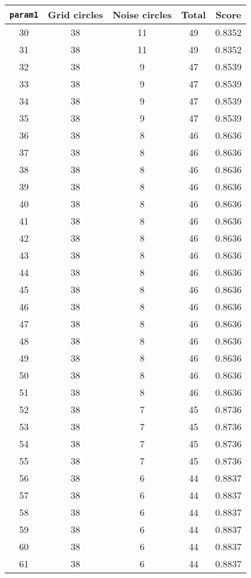\documentclass[letterpaper, 12pt]{article}
\begin{document}
\begin{longtable}{|c|c|c|c|c|}
\hline
\textbf{\texttt{param1}} & \textbf{Grid circles} & \textbf{Noise circles} & \textbf{Total} & \textbf{Score} \\
\hline
30 & 38 & 11 & 49 & 0.8352 \\
\hline
31 & 38 & 11 & 49 & 0.8352 \\
\hline
32 & 38 & 9 & 47 & 0.8539 \\
\hline
33 & 38 & 9 & 47 & 0.8539 \\
\hline
34 & 38 & 9 & 47 & 0.8539 \\
\hline
35 & 38 & 9 & 47 & 0.8539 \\
\hline
36 & 38 & 8 & 46 & 0.8636 \\
\hline
37 & 38 & 8 & 46 & 0.8636 \\
\hline
38 & 38 & 8 & 46 & 0.8636 \\
\hline
39 & 38 & 8 & 46 & 0.8636 \\
\hline
40 & 38 & 8 & 46 & 0.8636 \\
\hline
41 & 38 & 8 & 46 & 0.8636 \\
\hline
42 & 38 & 8 & 46 & 0.8636 \\
\hline
43 & 38 & 8 & 46 & 0.8636 \\
\hline
44 & 38 & 8 & 46 & 0.8636 \\
\hline
45 & 38 & 8 & 46 & 0.8636 \\
\hline
46 & 38 & 8 & 46 & 0.8636 \\
\hline
47 & 38 & 8 & 46 & 0.8636 \\
\hline
48 & 38 & 8 & 46 & 0.8636 \\
\hline
49 & 38 & 8 & 46 & 0.8636 \\
\hline
50 & 38 & 8 & 46 & 0.8636 \\
\hline
51 & 38 & 8 & 46 & 0.8636 \\
\hline
52 & 38 & 7 & 45 & 0.8736 \\
\hline
53 & 38 & 7 & 45 & 0.8736 \\
\hline
54 & 38 & 7 & 45 & 0.8736 \\
\hline
55 & 38 & 7 & 45 & 0.8736 \\
\hline
56 & 38 & 6 & 44 & 0.8837 \\
\hline
57 & 38 & 6 & 44 & 0.8837 \\
\hline
58 & 38 & 6 & 44 & 0.8837 \\
\hline
59 & 38 & 6 & 44 & 0.8837 \\
\hline
60 & 38 & 6 & 44 & 0.8837 \\
\hline
61 & 38 & 6 & 44 & 0.8837 \\

\end{longtable}
\end{document}
